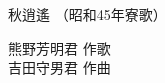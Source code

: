 \documentclass[10pt,b5j]{tarticle} %
\begin{document}
\begin{minipage}[c]{0.7\hsize} %
    \begin{center}
        {\LARGE
            秋逍遙 %
        }
        {\small 
            （昭和45年寮歌） %
        }
    \end{center}
\end{minipage}
\begin{minipage}[c]{0.3\hsize} %
    \begin{flushright} %
        熊野芳明君 作歌\\吉田守男君 作曲 %
    \end{flushright}
\end{minipage}
\end{document}
